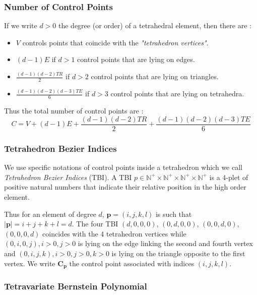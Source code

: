 \documentclass[a4paper,11pt]{article}
\newcommand{\nvertices}{{ V}}
\newcommand{\nedges}{{ E}}
\newcommand{\ntriangles}{{ TR}}
\newcommand{\ntetrahedra}{{ TE}}
\newcommand{\ncontrols}{{C}}
\newcommand{\control}{{\mathbf C}}
\newcommand{\degree}{{d}}
\newcommand{\naturalSet}{{\mathbb N}}
\begin{document}
\subsubsection{Number of Control Points}

If we write $\degree>0$ the degree (or order) of a tetrahedral element, then there are :

\begin{itemize}
	\item $\nvertices$ controls points that coincide with the {\em "tetrahedron vertices"}.
	\item $(\degree-1) \nedges$ if $\degree>1$ control points that are lying on edges. 
	\item $\frac{(\degree-1) (\degree-2) \ntriangles}{2}$ if $\degree>2$ control points that are lying on triangles. 
	\item $\frac{(\degree-1) (\degree-2) (\degree-3) \ntetrahedra}{6}$ if $\degree>3$ control points that are lying on tetrahedra. 
\end{itemize}

Thus the total number of control points are :
\[
\ncontrols=\nvertices+(\degree-1) \nedges+\frac{(\degree-1) (\degree-2) \ntriangles}{2}+\frac{(\degree-1) (\degree-2) (\degree-3) \ntetrahedra}{6}
\]
\subsubsection{Tetrahedron Bezier Indices}

We use specific notations of control points inside a tetrahedron which we call {\em Tetrahedron Bezier Indices} (TBI).
A TBI $p\in \naturalSet^{+}\times\naturalSet^{+}\times\naturalSet^{+}\times\naturalSet^{+}$ is a 4-plet of positive natural numbers that indicate their relative position in the high order element. 

Thus for an element of degree $\degree$, ${\mathbf p}=(i,j,k,l)$ is such that $|{\mathbf p}|=i+j+k+l=\degree$.  The four TBI $(\degree,0,0,0)$, $(0,\degree,0,0)$, $(0,0,\degree,0)$, $(0,0,0,\degree)$ coincides with the 4 tetrahedron vertices while $(0,i,0,j), i>0, j>0$ is lying on the edge linking the second and fourth vertex and   $(0,i,j,k), i>0, j>0, k>0$ is lying on the triangle opposite to the first vertex. We write $\control_{\mathbf p}$ the control point associated with indices $(i,j,k,l)$.

\subsubsection{Tetravariate Bernstein Polynomial}
\end{document}
